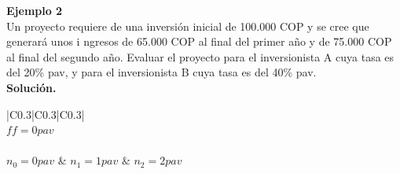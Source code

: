 \textbf{Ejemplo 2}\\
Un proyecto requiere de una inversión inicial de 100.000 COP y se cree que generará unos i
ngresos de 65.000 COP al final del primer año y de 75.000 COP al final del segundo año. 
Evaluar el proyecto para el inversionista A cuya tasa es del 20\% pav, y para el inversionista B cuya tasa es del 40\% pav.\\



\textbf{Solución.}\\
\begin{center}
	\renewcommand{\arraystretch}{1.5}%
	\begin{longtable}[H]{|C{0.3\linewidth}|C{0.3\linewidth}|C{0.3\linewidth}|}
		\hline
		   \\ \hline
		 {$ff = 0 pav$} \\ \hline
		   \\ \hline
		$n_{0} = 0 pav$   & $n_{1} = 1 pav$ & $n_{2} =  2 pav$\\ \hline
		 \\
		 \\ \hline


  

\end{longtable}
\end{center}
